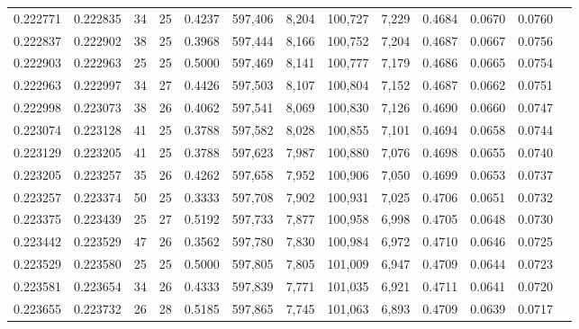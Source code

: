 \begin{tabular}{rrrrrrrrrrrrr}
0.222771 & 0.222835 &  34 &  25 &                                     0.4237 & 597,406 &   8,204 & 100,727 &   7,229 & 0.4684 & 0.0670 & 0.0760 \\
0.222837 & 0.222902 &  38 &  25 &                                     0.3968 & 597,444 &   8,166 & 100,752 &   7,204 & 0.4687 & 0.0667 & 0.0756 \\
0.222903 & 0.222963 &  25 &  25 &                                     0.5000 & 597,469 &   8,141 & 100,777 &   7,179 & 0.4686 & 0.0665 & 0.0754 \\
0.222963 & 0.222997 &  34 &  27 &                                     0.4426 & 597,503 &   8,107 & 100,804 &   7,152 & 0.4687 & 0.0662 & 0.0751 \\
0.222998 & 0.223073 &  38 &  26 &                                     0.4062 & 597,541 &   8,069 & 100,830 &   7,126 & 0.4690 & 0.0660 & 0.0747 \\
0.223074 & 0.223128 &  41 &  25 &                                     0.3788 & 597,582 &   8,028 & 100,855 &   7,101 & 0.4694 & 0.0658 & 0.0744 \\
0.223129 & 0.223205 &  41 &  25 &                                     0.3788 & 597,623 &   7,987 & 100,880 &   7,076 & 0.4698 & 0.0655 & 0.0740 \\
0.223205 & 0.223257 &  35 &  26 &                                     0.4262 & 597,658 &   7,952 & 100,906 &   7,050 & 0.4699 & 0.0653 & 0.0737 \\
0.223257 & 0.223374 &  50 &  25 &                                     0.3333 & 597,708 &   7,902 & 100,931 &   7,025 & 0.4706 & 0.0651 & 0.0732 \\
0.223375 & 0.223439 &  25 &  27 &                                     0.5192 & 597,733 &   7,877 & 100,958 &   6,998 & 0.4705 & 0.0648 & 0.0730 \\
0.223442 & 0.223529 &  47 &  26 &                                     0.3562 & 597,780 &   7,830 & 100,984 &   6,972 & 0.4710 & 0.0646 & 0.0725 \\
0.223529 & 0.223580 &  25 &  25 &                                     0.5000 & 597,805 &   7,805 & 101,009 &   6,947 & 0.4709 & 0.0644 & 0.0723 \\
0.223581 & 0.223654 &  34 &  26 &                                     0.4333 & 597,839 &   7,771 & 101,035 &   6,921 & 0.4711 & 0.0641 & 0.0720 \\
0.223655 & 0.223732 &  26 &  28 &                                     0.5185 & 597,865 &   7,745 & 101,063 &   6,893 & 0.4709 & 0.0639 & 0.0717 \\

\end{tabular}
